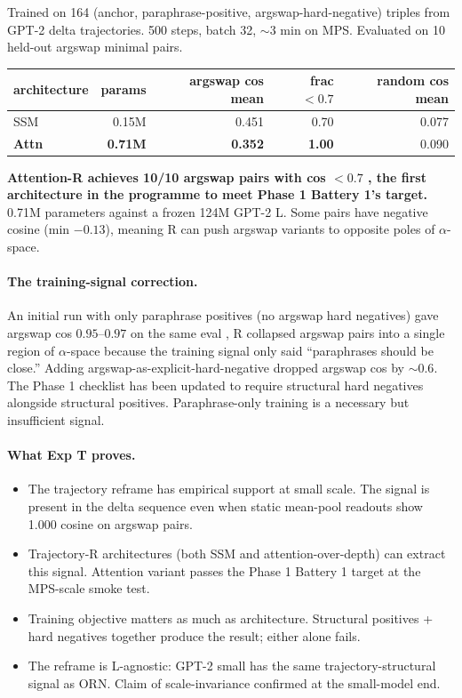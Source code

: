 \documentclass[10pt, twocolumn, a4paper]{article}
\begin{document}
Trained on 164 (anchor, paraphrase-positive, argswap-hard-negative) triples from GPT-2 delta trajectories. 500 steps, batch 32, $\sim$3 min on MPS. Evaluated on 10 held-out argswap minimal pairs.

\begin{center}\small
\begin{tabular}{lrrrr}
\toprule
architecture & params & argswap cos mean & frac $< 0.7$ & random cos mean \\
\midrule
SSM      & 0.15M & 0.451 & 0.70 & 0.077 \\
\textbf{Attn}     & \textbf{0.71M} & \textbf{0.352} & \textbf{1.00} & 0.090 \\
\bottomrule
\end{tabular}
\end{center}

\textbf{Attention-R achieves 10/10 argswap pairs with cos $< 0.7$ ,  the first architecture in the programme to meet Phase 1 Battery 1's target.} 0.71M parameters against a frozen 124M GPT-2 L. Some pairs have negative cosine (min $-0.13$), meaning R can push argswap variants to opposite poles of $\alpha$-space.

\paragraph{The training-signal correction.} An initial run with only paraphrase positives (no argswap hard negatives) gave argswap cos $0.95$--$0.97$ on the same eval ,  R collapsed argswap pairs into a single region of $\alpha$-space because the training signal only said ``paraphrases should be close.'' Adding argswap-as-explicit-hard-negative dropped argswap cos by $\sim 0.6$. The Phase 1 checklist has been updated to require structural hard negatives alongside structural positives. Paraphrase-only training is a necessary but insufficient signal.

\paragraph{What Exp T proves.}
\begin{itemize}[nosep]
\item The trajectory reframe has empirical support at small scale. The signal is present in the delta sequence even when static mean-pool readouts show 1.000 cosine on argswap pairs.
\item Trajectory-R architectures (both SSM and attention-over-depth) can extract this signal. Attention variant passes the Phase 1 Battery 1 target at the MPS-scale smoke test.
\item Training objective matters as much as architecture. Structural positives + hard negatives together produce the result; either alone fails.
\item The reframe is L-agnostic: GPT-2 small has the same trajectory-structural signal as ORN. Claim of scale-invariance confirmed at the small-model end.
\end{itemize}
\end{document}
